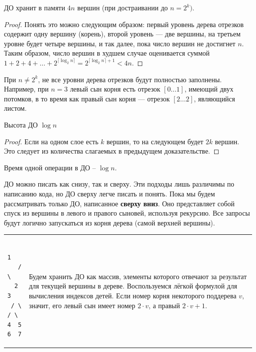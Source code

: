 \begin{Thm}\label{thm@splay}
	ДО хранит в памяти $4n$ вершин (при достраивании до $n=2^k)$.\end{Thm}
\begin{proof}
	Понять это можно следующим образом: первый уровень дерева отрезков содержит одну вершину (корень), второй уровень — две вершины, на третьем уровне будет четыре вершины, и так далее, пока число вершин не достигнет $n$. Таким образом, число вершин в худшем случае оценивается суммой 
	$1 + 2 + 4 + \dots + 2^{\lceil\log_2 n\rceil} = 2^{\lceil\log_2 n\rceil + 1} < 4n$.
\end{proof}

\begin{Rem}При $n \ne 2^k$, не все уровни дерева отрезков будут полностью заполнены. Например, при $n=3$ левый сын корня есть отрезок $[0 \ldots 1]$, имеющий двух потомков, в то время как правый сын корня — отрезок $[2 \ldots 2]$, являющийся листом.
\end{Rem}

\begin{Thm}\label{thm@splay}
	Высота ДО $\log n$\end{Thm}
\begin{proof}
	Если на одном слое есть $k$ вершин, то на следующем будет $2k$ вершин.
	Это следует из количества слагаемых в предыдущем доказательстве.
\end{proof}

\begin{Cons}Время одной операции в ДО -- $\log n$.\end{Cons}

\pagebreak
\up\up\up
{}

ДО можно писать как снизу, так и сверху. Эти подходы лишь различимы по написанию кода, но ДО сверху легче писать и понять. Пока мы будем рассматривать только ДО, написанное {\bf сверху вниз}. Оно представляет собой спуск из вершины в левого и правого сыновей, используя рекурсию. Все запросы будут логично запускаться из корня дерева (самой верхней вершины).


\down
\begin{tabular}{m{}m{}}
	\begin{minipage}{\textwidth}
\begin{verbatim}
    1  
   / \
  2   3
 / \ / \
4  5 6  7      
\end{verbatim}
	\end{minipage} 
	&
	Будем хранить ДО как массив, элементы которого отвечают за результат для текущей вершины в дереве.
	Воспользуемся лёгкой формулой для вычисления индексов детей. Если номер корня некоторого поддерева $v$, значит, его левый сын имеет номер $2 \cdot v$, а правый $2 \cdot v + 1$.
\end{tabular}
\down


